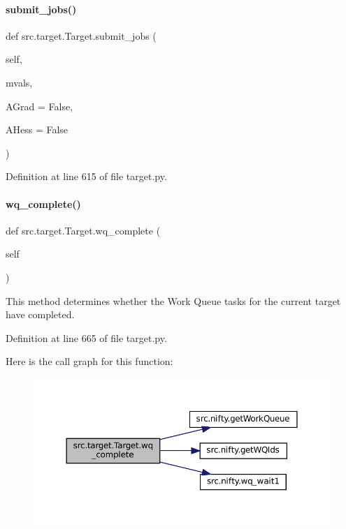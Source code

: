 \paragraph{\texorpdfstring{submit\+\_\+jobs()}{submit\_jobs()}}
{\footnotesize\ttfamily def src.\+target.\+Target.\+submit\+\_\+jobs (\begin{DoxyParamCaption}\item[{}]{self,  }\item[{}]{mvals,  }\item[{}]{A\+Grad = {\ttfamily False},  }\item[{}]{A\+Hess = {\ttfamily False} }\end{DoxyParamCaption})}



Definition at line 615 of file target.\+py.

\mbox{\label{classsrc_1_1target_1_1Target_aeb7582896efcfe1d0316a4ee80fc5634}} 
\paragraph{\texorpdfstring{wq\+\_\+complete()}{wq\_complete()}}
{\footnotesize\ttfamily def src.\+target.\+Target.\+wq\+\_\+complete (\begin{DoxyParamCaption}\item[{}]{self }\end{DoxyParamCaption})}



This method determines whether the Work Queue tasks for the current target have completed. 



Definition at line 665 of file target.\+py.

Here is the call graph for this function\+:
\nopagebreak
\begin{figure}[H]
\begin{center}
\leavevmode
\includegraphics[width=350pt]{classsrc_1_1target_1_1Target_aeb7582896efcfe1d0316a4ee80fc5634_cgraph}
\end{center}
\end{figure}
\mbox{\label{classsrc_1_1target_1_1Target_af4d54bc36363a73ab3cec203a30d72be}} 
